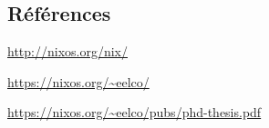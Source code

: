 \documentclass[final]{beamer}
\begin{document}
\begin{frame}[fragile]
\begin{multicols}{3}


\subsection{Références}

\begin{thebibliography}{99}

 \url{http://nixos.org/nix/}

 \url{https://nixos.org/~eelco/}

 \url{https://nixos.org/~eelco/pubs/phd-thesis.pdf}


\end{thebibliography}

\end{multicols}

\end{frame}
\end{document}
